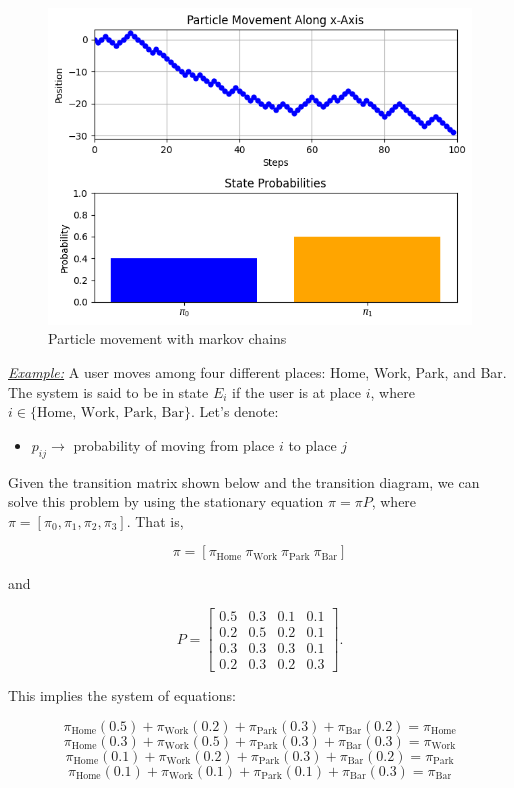 \documentclass[a4paper,10pt]{article}
\begin{document}
\begin{figure}[ht]
    \centering
    \includegraphics[width=0.6\linewidth]{Figures/markov_example_1.png}
    \caption{Particle movement with markov chains}
    \label{fig:markov_example_1}
\end{figure}


\noindent \underline{\textit{Example:}} A user moves among four different places: Home, Work, Park, and Bar. The system is said to be in state $E_i$ if the user is at place $i$, where $i \in \{\text{Home, Work, Park, Bar}\}$. Let's denote:

\begin{itemize}
    \item $p_{ij} \rightarrow$ probability of moving from place $i$ to place $j$
\end{itemize}

Given the transition matrix shown below and the transition diagram, we can solve this problem by using the stationary equation $\pi = \pi P$, where $\pi = [\pi_0, \pi_1, \pi_2, \pi_3]$. That is,

\[
\pi = [\pi_{\text{Home}} \ \pi_{\text{Work}} \ \pi_{\text{Park}} \ \pi_{\text{Bar}}]
\]

and

\[
P = \begin{bmatrix}
0.5 & 0.3 & 0.1 & 0.1 \\ 
0.2 & 0.5 & 0.2 & 0.1 \\ 
0.3 & 0.3 & 0.3 & 0.1 \\ 
0.2 & 0.3 & 0.2 & 0.3
\end{bmatrix}.
\]

This implies the system of equations:

\[
\pi_{\text{Home}}(0.5) + \pi_{\text{Work}}(0.2) + \pi_{\text{Park}}(0.3) + \pi_{\text{Bar}}(0.2) = \pi_{\text{Home}}
\]
\[
\pi_{\text{Home}}(0.3) + \pi_{\text{Work}}(0.5) + \pi_{\text{Park}}(0.3) + \pi_{\text{Bar}}(0.3) = \pi_{\text{Work}}
\]
\[
\pi_{\text{Home}}(0.1) + \pi_{\text{Work}}(0.2) + \pi_{\text{Park}}(0.3) + \pi_{\text{Bar}}(0.2) = \pi_{\text{Park}}
\]
\[
\pi_{\text{Home}}(0.1) + \pi_{\text{Work}}(0.1) + \pi_{\text{Park}}(0.1) + \pi_{\text{Bar}}(0.3) = \pi_{\text{Bar}}
\]
\end{document}

